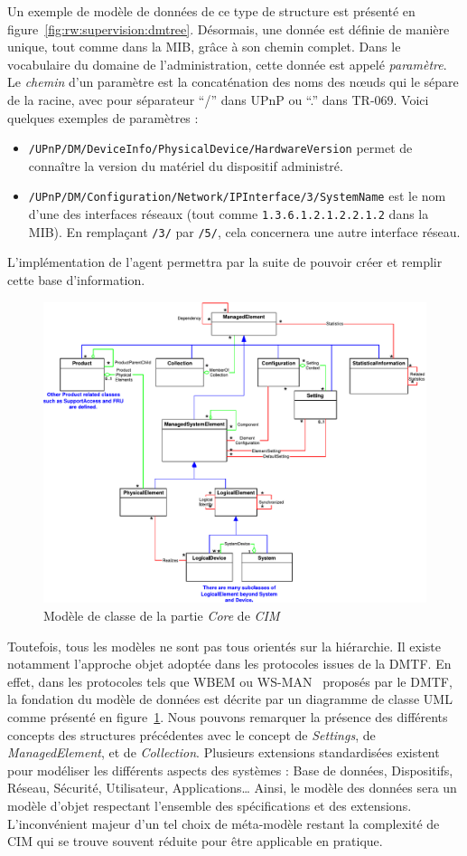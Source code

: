Un exemple de modèle de données de ce type de structure est présenté en figure~\ref{fig:rw:supervision:dmtree}. Désormais, une donnée est définie de manière unique, tout comme dans la MIB, grâce à son chemin complet. Dans le vocabulaire du domaine de l'administration, cette donnée est appelé \textit{paramètre}. Le \textit{chemin} d'un paramètre est la concaténation des noms des nœuds qui le sépare de la racine, avec pour séparateur \enquote{/} dans UPnP ou \enquote{.} dans TR-069. Voici quelques exemples de paramètres :
\begin{itemize}
\item \verb|/UPnP/DM/DeviceInfo/PhysicalDevice/HardwareVersion| permet de connaître la version du matériel du dispositif administré. 
\item \verb|/UPnP/DM/Configuration/Network/IPInterface/3/SystemName| est le nom d'une des interfaces réseaux (tout comme \verb|1.3.6.1.2.1.2.2.1.2| dans la MIB). En remplaçant \verb|/3/| par \verb|/5/|, cela concernera une autre interface réseau.
\end{itemize}

L'implémentation de l'agent permettra par la suite de pouvoir créer et remplir cette base d'information.
 
\begin{figure}[ht]
    \centering
    \includegraphics[width=.75\textwidth]{fig/rw-supervision-cimcore}
    \caption{Modèle de classe de la partie \textit{Core} de \textit{CIM}}\label{fig:rw:supervision:cimcore}
\end{figure}
Toutefois, tous les modèles ne sont pas tous orientés sur la hiérarchie. Il existe notamment l'approche objet adoptée dans les protocoles issues de la DMTF. En effet, dans les protocoles tels que WBEM ou WS-MAN~\cite{DMTF:WS-MAN} proposés par le DMTF, la fondation du modèle de données est décrite par un diagramme de classe UML comme présenté en figure~\ref{fig:rw:supervision:cimcore}. Nous pouvons remarquer la présence des différents concepts des structures précédentes avec le concept de \textit{Settings}, de \textit{ManagedElement}, et de \textit{Collection}. Plusieurs extensions standardisées existent pour modéliser les différents aspects des systèmes : Base de données, Dispositifs, Réseau, Sécurité, Utilisateur, Applications\dots{} Ainsi, le modèle des données sera un modèle d'objet respectant l'ensemble des spécifications et des extensions. L'inconvénient majeur d'un tel choix de méta-modèle restant la complexité de CIM qui se trouve souvent réduite pour être applicable en pratique.


